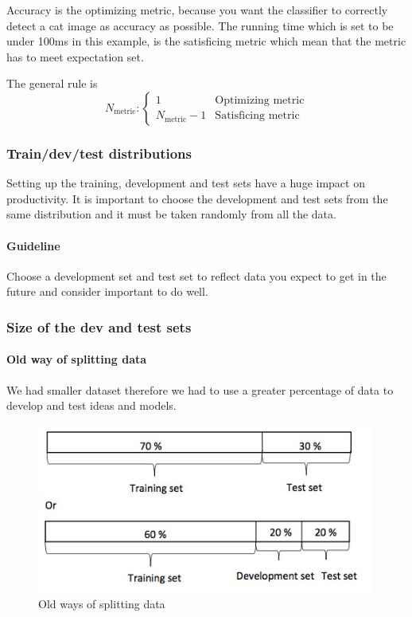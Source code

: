 \documentclass[UTF8]{article}
\begin{document}
Accuracy is the optimizing metric, because you want the classifier to correctly detect a cat image
as accuracy as possible. The running time which is set to be under 100ms in this example, is the
satisficing metric which mean that the metric has to meet expectation set.

The general rule is
$$ N_{\text{metric}}: \left\{\begin{array}{ll} 1 & \text{Optimizing metric} \\ N_{\text{metric}}-1
& \text{Satisficing metric} \end{array}\right. $$

\subsubsection{Train/dev/test distributions}
Setting up the training, development and test sets have a huge impact on productivity. It is
important to choose the development and test sets from the same distribution and it must be taken
randomly from all the data.

\paragraph{Guideline} Choose a development set and test set to reflect data you expect to get in
the future and consider important to do well.

\subsubsection{Size of the dev and test sets}
\paragraph{Old way of splitting data}
We had smaller dataset therefore we had to use a greater percentage of data to develop and test
ideas and models.

\begin{figure}[htb]
    \centering
    \includegraphics[width=30em]{figures/old-ways-splitting-data}
    \caption{Old ways of splitting data}
    \label{fig:old-ways-splitting-data}
\end{figure}
\end{document}
